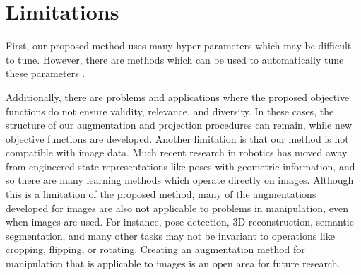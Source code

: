 \section{Limitations} \label{RSS:sec:limitations}

First, our proposed method uses many hyper-parameters which may be difficult to tune. However, there are methods which can be used to automatically tune these parameters \cite{Augerino2020,AutoAugment}.

Additionally, there are problems and applications where the proposed objective functions do not ensure validity, relevance, and diversity. In these cases, the structure of our augmentation and projection procedures can remain, while new objective functions are developed. Another limitation is that our method is not compatible with image data. Much recent research in robotics has moved away from engineered state representations like poses with geometric information, and so there are many learning methods which operate directly on images. Although this is a limitation of the proposed method, many of the augmentations developed for images are also not applicable to problems in manipulation, even when images are used. For instance, pose detection, 3D reconstruction, semantic segmentation, and many other tasks may not be invariant to operations like cropping, flipping, or rotating. Creating an augmentation method for manipulation that is applicable to images is an open area for future research.

